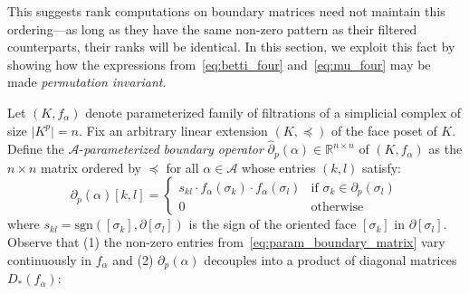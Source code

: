 \documentclass[10pt]{article}
\numberwithin{equation}{section}
\newcommand{\+}{%
	\raisebox{0.18ex}{\scaleobj{0.55}{+}}
}
\theoremstyle{definition}
\newtheorem{definition}{Definition}
\theoremstyle{definition}
\begin{document}
This suggests rank computations on boundary matrices need not maintain this ordering---as long as they have the same non-zero pattern as their filtered counterparts, their ranks will be identical.
In this section, we exploit this fact by showing how the expressions from~\eqref{eq:betti_four} and~\eqref{eq:mu_four} may be made \emph{permutation invariant}.

Let $(K, f_\alpha)$ denote parameterized family of filtrations of a simplicial complex of size $\lvert K^p \rvert = n$. Fix an arbitrary linear extension $(K, \preceq)$ of the face poset of $K$. 
Define the $\mathcal{A}$-\emph{parameterized} \emph{boundary operator} $\hat{\partial}_p(\alpha) \in \mathbb{R}^{n \times n}$ of $(K, f_\alpha)$ as the $n \times n$ matrix ordered by $\preceq$ for all $\alpha \in \mathcal{A}$ whose entries $(k,l)$ satisfy:
\begin{equation}\label{eq:param_boundary_matrix}
	\partial_p(\alpha)[k,l] = \begin{cases}
s_{kl} \cdot f_\alpha(\sigma_k) \cdot f_\alpha(\sigma_l) & \text{if } \sigma_k \in \partial_p(\sigma_l)\\
	0 & \text{otherwise}
\end{cases}
\end{equation}
where $s_{kl} = \mathrm{sgn}([\sigma_k], \partial [\sigma_l])$ is the sign of the oriented face $[\sigma_k]$ in $\partial[\sigma_l]$.
\noindent
Observe that (1) the non-zero entries from~\eqref{eq:param_boundary_matrix} vary continuously in $f_\alpha$ and (2) $\partial_p(\alpha)$ decouples into a product of diagonal matrices $D_\ast(f_\alpha)$: 
\end{document}
